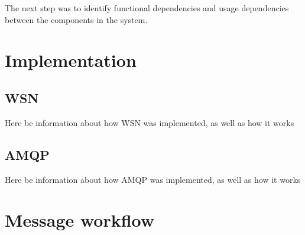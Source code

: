 The next step was to identify functional dependencies and usage dependencies between the components in the system. 

\section{Implementation}
\label{sec:architecture_and_implementation-implementation}

\subsection{WSN}
\label{subsec:architecture_and_implementation-implementation-wsn}

Here be information about how WSN was implemented, as well as how it works

\subsection{AMQP}
\label{subsec:architecture_and_implementation-implementation-amqp}

Here be information about how AMQP was implemented, as well as how it works

\clearpage

\section{Message workflow}
\label{sec:architecture_and_implementation-message_workflow}

